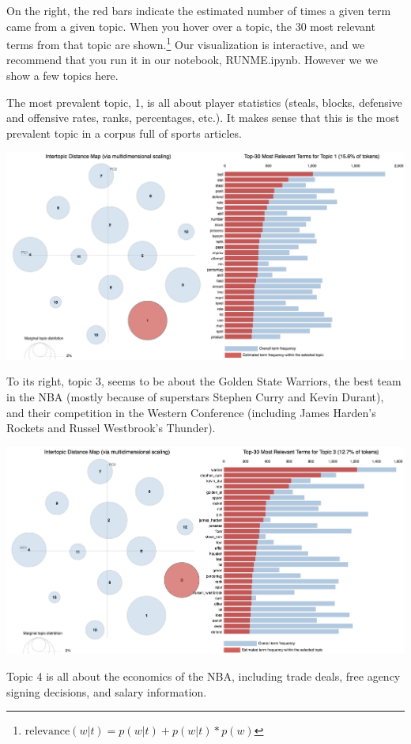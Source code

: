 \documentclass[11pt]{article}
\begin{document}
On the right, the red bars indicate the estimated number of times a given term came from a given topic. When you hover over a topic, the 30 most relevant terms from that topic are shown.\footnote{$\text{relevance}(w | t) = p(w | t) + p(w | t)*p(w)$}  Our visualization is interactive, and we recommend that you run it in our notebook, RUNME.ipynb.  However we we show a few topics here. 

The most prevalent topic, 1, is all about player statistics (steals, blocks, defensive and offensive rates, ranks, percentages, etc.). It makes sense that this is the most prevalent topic in a corpus full of sports articles. 

\includegraphics[width=470pt]{1.png} 

To its right, topic 3, seems to be about the Golden State Warriors, the best team in the NBA (mostly because of superstars Stephen Curry and Kevin Durant), and their competition in the Western Conference (including James Harden's Rockets and Russel Westbrook's Thunder). 

\includegraphics[width=470pt]{3.png} 

Topic 4 is all about the economics of the NBA, including trade deals, free agency signing decisions, and salary information.
\end{document}

